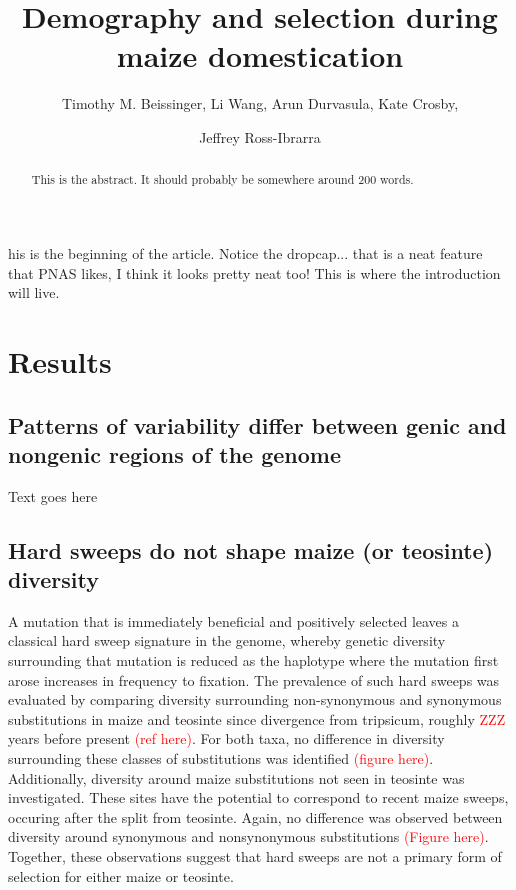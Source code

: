 \documentclass{pnastwo}
\begin{document}
\title{Demography and selection during maize domestication}
\author{Timothy M. Beissinger, Li Wang, Arun
  Durvasula, Kate Crosby, \and Jeffrey
  Ross-Ibrarra }


\maketitle

\begin{article}

\begin{abstract}
This is the abstract. It should probably be somewhere around 200 words.
\end{abstract}

his is the beginning of the article. Notice the
dropcap... that is a neat feature that PNAS likes, I think it looks
pretty neat too! This is where the introduction will live.



\section{Results}
\subsection{Patterns of variability differ between genic and
  nongenic regions of the genome}
Text goes here

\subsection{Hard sweeps do not shape maize (or teosinte) diversity}
A mutation that is immediately beneficial and positively selected leaves a classical hard
sweep signature in the genome, whereby genetic diversity surrounding
that mutation is reduced as the haplotype where the mutation first
arose increases in frequency to fixation. The prevalence of such hard
sweeps was evaluated by comparing diversity
surrounding non-synonymous and synonymous substitutions in maize and
teosinte since divergence from tripsicum, roughly \textcolor{red}{ZZZ} years before
present \textcolor{red}{(ref here)}. For both taxa, no difference in diversity
surrounding these classes of substitutions was identified \textcolor{red}{(figure
here)}. Additionally, diversity around maize substitutions 
not seen in teosinte was investigated. These sites have the
potential to correspond to recent maize sweeps, occuring after the
split from teosinte. Again, no difference was observed
between diversity around synonymous and nonsynonymous
substitutions \textcolor{red}{(Figure here)}. Together, these observations suggest that hard sweeps
are not a primary form of selection for either maize or teosinte.


\end{article}
\end{document}
